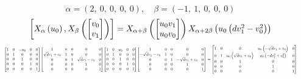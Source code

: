 \documentclass[11pt]{article}
\theoremstyle{definition}
\begin{document}
\[
\alpha = \left( 2, \  0, \  0, \  0, \  0\right), \quad \beta = \left( -1, \  1, \  0, \  0, \  0\right)
\]
\[
\scaletoalign{\textwidth}{\left[ X_{\alpha}\left(u_{0}\right), X_{\beta}\left(\left[\begin{matrix}v_{0}\\v_{1}\end{matrix}\right]\right) \right] = X_{\alpha + \beta}\left(\left[\begin{matrix}u_{0} v_{1}\\u_{0} v_{0}\end{matrix}\right]\right) X_{\alpha + 2\beta}\left(u_{0} \left(d v_{1}^{2} - v_{0}^{2}\right)\right)}
\]
\[
\scaletoalign{\textwidth}{{\left[\begin{matrix}1 & 0 & - u_{0} & 0 & 0\\0 & 1 & 0 & 0 & 0\\0 & 0 & 1 & 0 & 0\\0 & 0 & 0 & 1 & 0\\0 & 0 & 0 & 0 & 1\end{matrix}\right]} {\left[\begin{matrix}1 & 0 & 0 & 0 & 0\\\sqrt{d} v_{1} + v_{0} & 1 & 0 & 0 & 0\\0 & 0 & 1 & \sqrt{d} v_{1} - v_{0} & 0\\0 & 0 & 0 & 1 & 0\\0 & 0 & 0 & 0 & 1\end{matrix}\right]} {\left[\begin{matrix}1 & 0 & u_{0} & 0 & 0\\0 & 1 & 0 & 0 & 0\\0 & 0 & 1 & 0 & 0\\0 & 0 & 0 & 1 & 0\\0 & 0 & 0 & 0 & 1\end{matrix}\right]} {\left[\begin{matrix}1 & 0 & 0 & 0 & 0\\- \sqrt{d} v_{1} - v_{0} & 1 & 0 & 0 & 0\\0 & 0 & 1 & - \sqrt{d} v_{1} + v_{0} & 0\\0 & 0 & 0 & 1 & 0\\0 & 0 & 0 & 0 & 1\end{matrix}\right]} = {\left[\begin{matrix}1 & 0 & 0 & u_{0} \left(- \sqrt{d} v_{1} + v_{0}\right) & 0\\0 & 1 & u_{0} \left(\sqrt{d} v_{1} + v_{0}\right) & u_{0} \left(- d v_{1}^{2} + v_{0}^{2}\right) & 0\\0 & 0 & 1 & 0 & 0\\0 & 0 & 0 & 1 & 0\\0 & 0 & 0 & 0 & 1\end{matrix}\right]}}
\]
\end{document}
